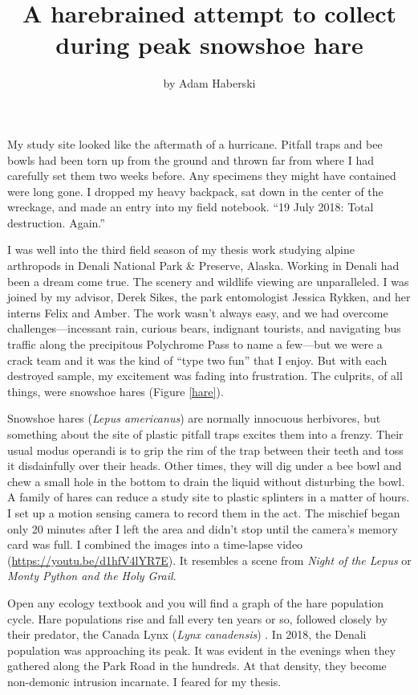 \title{A harebrained attempt to collect during peak snowshoe hare}

\subtitle{}

\author{by Adam Haberski}

\maketitle

My study site looked like the aftermath of a hurricane. Pitfall traps and bee bowls had been torn up from the ground and thrown far from where I had carefully set them two weeks before. Any specimens they might have contained were long gone. I dropped my heavy backpack, sat down in the center of the wreckage, and made an entry into my field notebook. “19 July 2018: Total destruction. Again.”

I was well into the third field season of my thesis work studying alpine arthropods in Denali National Park \& Preserve, Alaska. Working in Denali had been a dream come true. The scenery and wildlife viewing are unparalleled. I was joined by my advisor, Derek Sikes, the park entomologist Jessica Rykken, and her interns Felix and Amber. The work wasn’t always easy, and we had overcome challenges---incessant rain, curious bears, indignant tourists, and navigating bus traffic along the precipitous Polychrome Pass to name a few---but we were a crack team and it was the kind of  “type two fun” that I enjoy. But with each destroyed sample, my excitement was fading into frustration. The culprits, of all things, were snowshoe hares (Figure \ref{hare}).

Snowshoe hares (\textit{Lepus americanus}) are normally innocuous herbivores, but something about the site of plastic pitfall traps excites them into a frenzy. Their usual modus operandi is to grip the rim of the trap between their teeth and toss it disdainfully over their heads. Other times, they will dig under a bee bowl and chew a small hole in the bottom to drain the liquid without disturbing the bowl. A family of hares can reduce a study site to plastic splinters in a matter of hours. I set up a motion sensing camera to record them in the act. The mischief began only 20 minutes after I left the area and didn’t stop until the camera’s memory card was full. I combined the images into a time-lapse video (\url{https://youtu.be/d1hfV4lYR7E}). It resembles a scene from \textit{Night of the Lepus} or \textit{Monty Python and the Holy Grail}.

Open any ecology textbook and you will find a graph of the hare population cycle. Hare populations rise and fall every ten years or so, followed closely by their predator, the Canada Lynx (\textit{Lynx canadensis}) \citep{Krebsetal2001}. In 2018, the Denali population was approaching its peak. It was evident in the evenings when they gathered along the Park Road in the hundreds. At that density, they become non-demonic intrusion incarnate. I feared for my thesis. 

